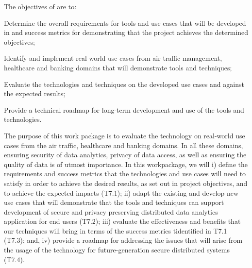 \addtocounter{wpno}{1}
\begin{Workpackage}{\thewpno}
\WPTitle{\wpname{\thewpno}}


\begin{WPObjectives}
The objectives of \theWP{} are to:
\begin{compactitem}
\item	Determine the overall requirements for tools and use cases that will be developed in \TheProject{} and success metrics for demonstrating that the project achieves the determined objectives;
\item	Identify and implement real-world use cases from air traffic management, healthcare and banking domains that will demonstrate \TheProject{} tools and techniques;
\item	Evaluate the \TheProject{} technologies and techniques on the developed use cases and against the expected results;
\item	Provide a technical roadmap for long-term development and use of the \TheProject tools and technologies.
\end{compactitem}
\end{WPObjectives}

\begin{WPDescription}
The purpose of this work package is to evaluate the \TheProject technology on real-world use cases from the air traffic, healthcare and banking domains. In all these domains, ensuring security of data analytics, privacy of data access, as well as ensuring the quality of data is of utmost importance. In this workpackage, we will i) define the requirements and success metrics that the \TheProject{} technologies and use cases will need to satisfy in order to achieve the desired results, as set out in project objectives, and to achieve the expected impacts (T7.1); ii) adapt the existing and develop new use cases that will demonstrate that the \TheProject{} tools and techniques can support development of secure and privacy preserving distributed data analytics application for end users (T7.2); iii)  evaluate the effectiveness and benefits that our techniques will bring in terms of the success metrics tidentified in T7.1 (T7.3); and, iv) provide a roadmap for addressing the issues that will arise from the usage of the \TheProject{} technology for future-generation
secure distributed systems (T7.4).
\end{WPDescription}

\begin{Task}


\end{Task}
\end{Workpackage}
